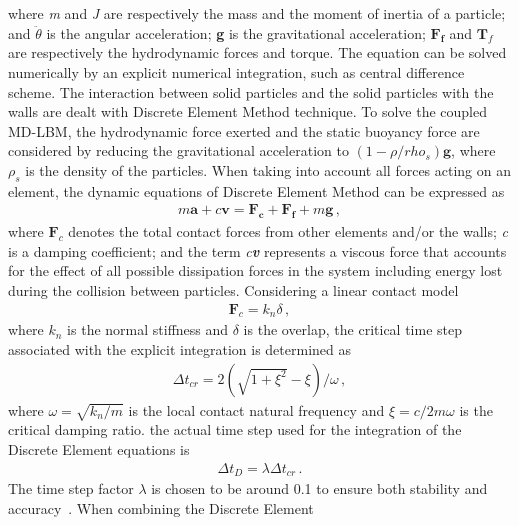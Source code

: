 %
\noindent where \textit{m} and \textit{J} are respectively the mass and the 
moment of inertia of a particle; and $\ddot{\theta}$ is the angular 
acceleration; \textbf{g} is the gravitational acceleration; $\mathbf{F_f}$ and 
$\mathbf{T}_{f}$ are respectively the hydrodynamic forces and torque. The 
equation can be solved numerically by an explicit numerical integration, such 
as central difference scheme. The interaction between solid particles and the 
solid particles with the walls are dealt with Discrete Element Method 
technique. To solve the coupled MD-LBM, the hydrodynamic force exerted and the 
static buoyancy force are considered by reducing the gravitational acceleration 
to $(1- \rho/rho_{s})\mathbf{g}$, where $\rho_{s}$ is the density of the 
particles. When taking into account all forces acting on an element, the 
dynamic equations of Discrete Element Method can be expressed as
%
\begin{align}
\label{eq:mde}
\mathit{m}\mathbf{a} +\mathit{c}\mathbf{v} = \mathbf{F_c} + \mathbf{F_f} 
+\mathit{m}\mathbf{g} \,,
\end{align} 
%
\noindent where $\mathbf{F}_{c}$ denotes the total contact forces from other 
elements and/or the walls; \textit{c} is a damping coefficient; and the term 
\textit{c\textbf{v}} represents a viscous force that accounts for the effect of 
all possible dissipation forces in the system including energy lost during the 
collision between particles. Considering a linear contact model
%
\begin{align}
\mathbf{F}_{c}=\mathit{k}_{\mathit{n}} \delta \,,
\end{align}
%
\noindent where $\mathit{k}_{\mathit{n}}$ is the normal stiffness and $\delta$ 
is the overlap, the critical time step associated with the explicit integration 
is determined as~\citep{He1997}
%
\begin{align}
\Delta t_{\mathit{cr}}= 2(\sqrt{1 + \xi^{2}}-\xi) / \omega \,,
\end{align}
%
\noindent where $\omega = \sqrt{\mathit{k}_{\mathit{n}}/\mathit{m}}$ is the 
local contact natural frequency and $\xi = \mathit{c}/2\mathit{m}\omega$ is the 
critical damping ratio. the actual time step used for the integration of the 
Discrete Element equations is
%
\begin{align}
\Delta \mathit{t}_{D}=\lambda \Delta \mathit{t}_{cr} \,.
\end{align}
%
The time step factor $\lambda$ is chosen to be around 0.1 to ensure both 
stability and accuracy~\citep{He1997}. When combining the Discrete Element 
